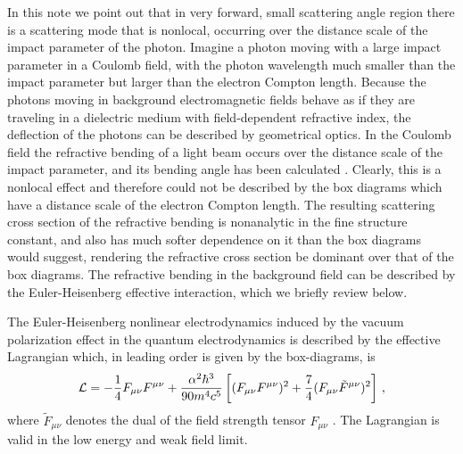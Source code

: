 \documentclass[aps,tightenlines,preprint]{revtex4-1}
\newcommand{\bear}{\begin{eqnarray}}
\newcommand{\eear}{\end{eqnarray}}
\begin{document}
In this note we point out that in  very forward, small scattering angle region there is a
scattering mode that is nonlocal,
 occurring over the distance scale of the impact parameter of the photon. 
 Imagine a photon moving with a large impact parameter in a Coulomb field, with the photon wavelength
 much smaller than the impact parameter but larger than the electron Compton length.
Because the photons moving in  background electromagnetic fields behave as if they are traveling in a dielectric
medium with field-dependent refractive index, the deflection of the photons can be described by 
geometrical optics. In the Coulomb field the refractive bending of a light beam occurs over the
distance scale of the impact parameter, and its bending angle
has been calculated \cite{lee1}. Clearly, this is a nonlocal effect and therefore could not be described by the
box diagrams which have a distance scale of the electron Compton length.
The resulting scattering cross section of the refractive bending is nonanalytic in the fine structure
constant, and also has much softer dependence on it than the box diagrams would suggest,
 rendering the refractive cross section
be dominant over that of the box diagrams.
The refractive bending in the background field can be described by the Euler-Heisenberg effective interaction,
which we briefly review below.

The Euler-Heisenberg nonlinear electrodynamics induced by the
vacuum polarization effect in the quantum electrodynamics
 is described by the effective
Lagrangian which, in leading order is given by the box-diagrams, is
\bear
{\cal L}= -\frac{1}{4} F_{\mu\nu}F^{\mu\nu} +
\frac{\alpha^2\hbar^3}{90m^4c^{5}}
\left[( F_{\mu\nu}F^{\mu\nu})^2+\frac{7}{4}
( F_{\mu\nu}\tilde F^{\mu\nu})^2\right]\,,
\label{lagrangian}
\eear  
where $\tilde{F}_{\mu\nu}$ denotes the dual of the 
field strength tensor $F_{\mu\nu}$ \cite{euler,schwinger}.
 The Lagrangian is valid
in the low energy and weak field limit.
\end{document}
